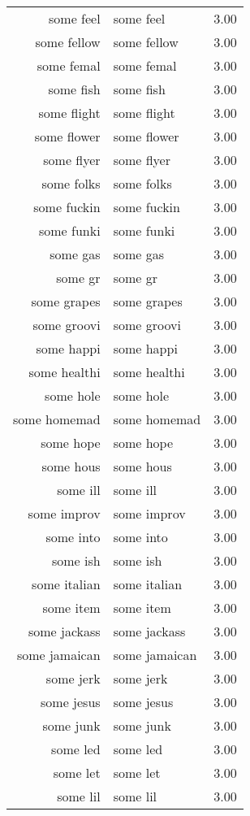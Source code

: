 \begin{table}[ht]
\begin{tabular}{rlr}
  some feel & some feel & 3.00 \\ 
  some fellow & some fellow & 3.00 \\ 
  some femal & some femal & 3.00 \\ 
  some fish & some fish & 3.00 \\ 
  some flight & some flight & 3.00 \\ 
  some flower & some flower & 3.00 \\ 
  some flyer & some flyer & 3.00 \\ 
  some folks & some folks & 3.00 \\ 
  some fuckin & some fuckin & 3.00 \\ 
  some funki & some funki & 3.00 \\ 
  some gas & some gas & 3.00 \\ 
  some gr & some gr & 3.00 \\ 
  some grapes & some grapes & 3.00 \\ 
  some groovi & some groovi & 3.00 \\ 
  some happi & some happi & 3.00 \\ 
  some healthi & some healthi & 3.00 \\ 
  some hole & some hole & 3.00 \\ 
  some homemad & some homemad & 3.00 \\ 
  some hope & some hope & 3.00 \\ 
  some hous & some hous & 3.00 \\ 
  some ill & some ill & 3.00 \\ 
  some improv & some improv & 3.00 \\ 
  some into & some into & 3.00 \\ 
  some ish & some ish & 3.00 \\ 
  some italian & some italian & 3.00 \\ 
  some item & some item & 3.00 \\ 
  some jackass & some jackass & 3.00 \\ 
  some jamaican & some jamaican & 3.00 \\ 
  some jerk & some jerk & 3.00 \\ 
  some jesus & some jesus & 3.00 \\ 
  some junk & some junk & 3.00 \\ 
  some led & some led & 3.00 \\ 
  some let & some let & 3.00 \\ 
  some lil & some lil & 3.00 \\ 

\end{tabular}
\end{table}
